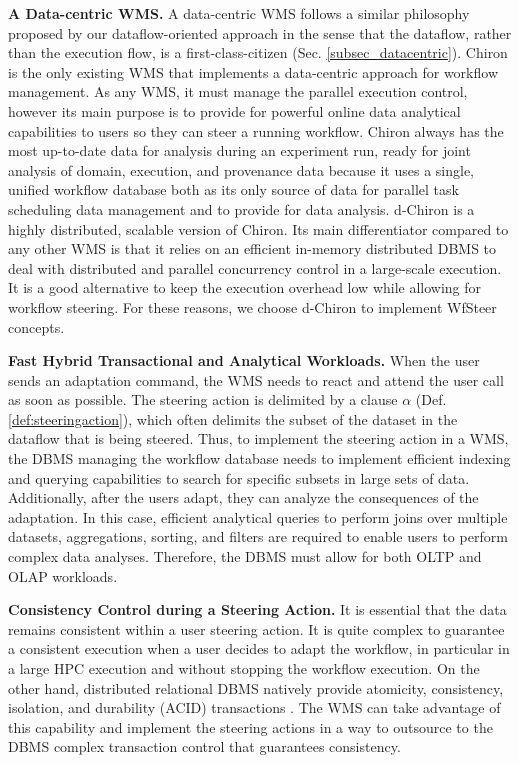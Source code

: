 \textbf{A Data-centric WMS.} A data-centric WMS follows a similar philosophy
proposed by our dataflow-oriented approach in the sense that the dataflow, rather than the execution flow, is a first-class-citizen (Sec. \ref{subsec_datacentric}).
Chiron \cite{Ogasawara2011algebraic, Dias2015Data-centric}
is the only existing WMS that implements a data-centric approach for workflow management.
As any WMS, it must manage the parallel execution control, however
its main purpose is to provide for powerful online data analytical capabilities to users so they can steer a running workflow.
Chiron always has the most up-to-date data for analysis during an experiment
run, ready for joint analysis of domain, execution, and provenance data because it uses a single, unified workflow database both as its only source of data for
parallel task scheduling data management and to provide for data analysis.
d-Chiron \cite{Souza2015Parallel} is a highly distributed, scalable version of Chiron.
Its main differentiator compared to any other WMS is that it relies on an
 efficient in-memory distributed DBMS to deal with distributed and parallel concurrency control in a large-scale execution. It is a good alternative to keep the execution overhead low while allowing for workflow steering.
 For these reasons, we choose d-Chiron to implement WfSteer concepts.

\textbf{Fast Hybrid Transactional and Analytical Workloads.}
When the user sends an adaptation command,
the WMS needs to react and attend the user call as soon as possible.
The steering action is delimited by a clause $\alpha$ (Def. \ref{def:steeringaction}), which often delimits the
subset of the dataset in the dataflow that is being steered.
Thus, to implement the steering action in a WMS,
the DBMS managing the workflow database needs to implement efficient indexing and  querying capabilities
to search for specific subsets in large sets of data.
Additionally, after the users adapt, they can analyze the
consequences of the adaptation. In this case, efficient
analytical queries to perform joins over multiple datasets,
aggregations, sorting, and filters are required to enable users
to perform complex data analyses. Therefore, the DBMS
must allow for both OLTP and OLAP workloads.

\textbf{Consistency Control during a Steering Action.} It is essential
that the data remains consistent within a user steering action.
It is quite complex to guarantee a consistent execution when a user
decides to adapt the workflow, in particular in a large HPC execution and
without stopping the workflow execution.
On the other hand, distributed relational DBMS natively provide atomicity, consistency,
isolation, and durability (ACID) transactions \cite{Ozsu2011Principles}.
The WMS can take advantage of this capability and implement the steering actions in a way to outsource to the DBMS complex transaction control that guarantees consistency.

